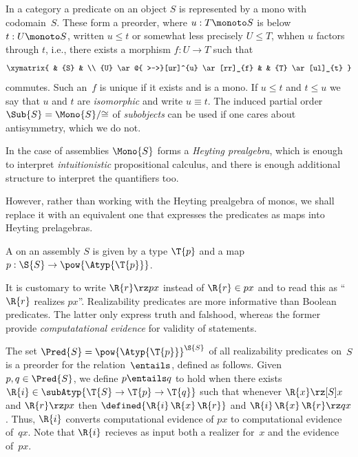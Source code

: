 In a category a predicate on an object $S$ is represented by a mono with codomain~$S$. These form a preorder, where $u : T \monoto S$ is below $t : U \monoto S$, written $u \leq t$ or somewhat less precisely $U \leq T$, whhen $u$ factors through $t$, i.e., there exists a morphism $f : U \to T$ such that
%
\begin{equation*}
  \xymatrix{
    &
    {S}
    &
    \\
    {U}
    \ar@{ >->}[ur]^{u}
    \ar[rr]_{f}
    &
    &
    {T}
    \ar[ul]_{t}
  }
\end{equation*}
%
commutes. Such an~$f$ is unique if it exists and is a mono. If $u \leq t$ and $t \leq u$ we say that $u$ and $t$ are \emph{isomorphic} and write $u \equiv t$. The induced partial order $\Sub{S} = \Mono{S}/{\cong}$ of \emph{subobjects} can be used if one cares about antisymmetry, which we do not.

In the case of assemblies $\Mono{S}$ forms a \emph{Heyting prealgebra}, which is enough to interpret \emph{intuitionistic} propositional calculus, and there is enough additional structure to interpret the quantifiers too.
%

However, rather than working with the Heyting prealgebra of monos, we shall replace it with an equivalent one that expresses the predicates as maps into Heyting prelagebras.

\begin{definition}
  A  on an assembly $S$ is given by a type $\T{p}$ and a
  map $p : \S{S} \to \pow{\Atyp{\T{p}}}$.
\end{definition}

It is customary to write $\R{r} \rz p x$ instead of $\R{r} \in p x$ and to read this as ``$\R{r}$ realizes $p x$''. Realizability predicates are more informative than Boolean predicates. The latter only express truth and falshood, whereas the former provide \emph{computatational evidence} for validity of statements.

The set $\Pred{S} = \pow{\Atyp{\T{p}}}^{\S{S}}$ of all realizability predicates on~$S$ is a preorder for the  relation~$\entails$, defined as follows. Given  $p, q \in \Pred{S}$, we define $p \entails q$ to hold when there exists $\R{i} \in \subAtyp{\T{S} \to \T{p} \to \T{q}}$ such that whenever $\R{x} \rz[S] x$ and $\R{r} \rz p x$ then $\defined{\R{i}\,\R{x}\,\R{r}}$ and $\R{i}\,\R{x}\,\R{r} \rz q x$.
Thus, $\R{i}$ converts computational evidence of $p x$ to computational evidence of~$q x$. Note that $\R{i}$ recieves as input both a realizer for~$x$ and the evidence of~$p x$.

